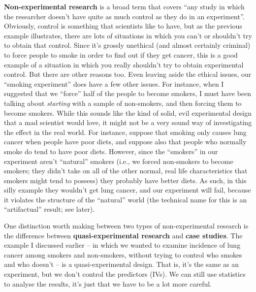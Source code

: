\documentclass[]{book}
\begin{document}
\textbf{Non-experimental research} is a broad term that covers ``any study in which the researcher doesn't have quite as much control as they do in an experiment''. Obviously, control is something that scientists like to have, but as the previous example illustrates, there are lots of situations in which you can't or shouldn't try to obtain that control. Since it's grossly unethical (and almost certainly criminal) to force people to smoke in order to find out if they get cancer, this is a good example of a situation in which you really shouldn't try to obtain experimental control. But there are other reasons too. Even leaving aside the ethical issues, our ``smoking experiment'' does have a few other issues. For instance, when I suggested that we ``force'' half of the people to become smokers, I must have been talking about {\emph{starting}} with a sample of non-smokers, and then forcing them to become smokers. While this sounds like the kind of solid, evil experimental design that a mad scientist would love, it might not be a very sound way of investigating the effect in the real world. For instance, suppose that smoking only causes lung cancer when people have poor diets, and suppose also that people who normally smoke do tend to have poor diets. However, since the ``smokers'' in our experiment aren't ``natural'' smokers (i.e., we forced non-smokers to become smokers; they didn't take on all of the other normal, real life characteristics that smokers might tend to possess) they probably have better diets. As such, in this silly example they wouldn't get lung cancer, and our experiment will fail, because it violates the structure of the ``natural'' world (the technical name for this is an ``artifactual'' result; see later).

One distinction worth making between two types of non-experimental research is the difference between \textbf{quasi-experimental research} and \textbf{case studies}. The example I discussed earlier -- in which we wanted to examine incidence of lung cancer among smokers and non-smokers, without trying to control who smokes and who doesn't -- is a quasi-experimental design. That is, it's the same as an experiment, but we don't control the predictors (IVs). We can still use statistics to analyse the results, it's just that we have to be a lot more careful.
\end{document}

